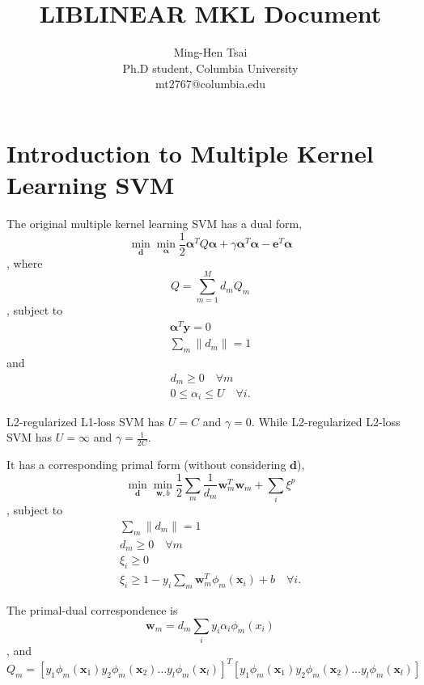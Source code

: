 \documentclass[12pt]{article}
\def\bw{{\boldsymbol w}}
\def\balpha{{\boldsymbol \alpha}}
\def\bd{{\boldsymbol d}}
\def\be{{\boldsymbol e}}
\def\bx{{\boldsymbol x}}
\def\by{{\boldsymbol y}}
\begin{document}
\title{LIBLINEAR MKL Document}
\author{Ming-Hen Tsai 
  \\ Ph.D student, Columbia University
  \\ mt2767@columbia.edu}
\maketitle
\section{Introduction to Multiple Kernel Learning SVM}
The original multiple kernel learning SVM has a dual form,
\begin{equation}
\label{eq:mkl_svm_dual}
\min_{\bd} \min_{\balpha} \frac{1}{2} \balpha^T Q \balpha + \gamma \balpha^T \balpha - \be^T \balpha 
\end{equation}
, where 
\begin{equation}
\label{eq:mkl_svm_dual_sum_kernel}
Q = \sum_{m=1}^M d_m Q_m 
\end{equation}
, subject to
\begin{align}
\label{eq:mkl_svm_dual_eq_constraint}
\balpha^T \by = 0 \\
\sum_m \|d_m\| = 1
\end{align}
and
\begin{align}
\label{eq:mkl_svm_dual_ineq_constraint}
d_m \ge 0 \quad \forall m\\
0 \le \alpha_i \le U \quad \forall i \mbox{.}
\end{align}

L2-regularized L1-loss SVM has $U = C$ and $\gamma = 0$. While
L2-regularized L2-loss SVM has $U = \infty$ and $\gamma = \frac{1}{2C}$.

It has a corresponding primal form (without considering $\bd$),
\begin{equation}
\label{eq:mkl_svm_primal}
\min_{\bd} \min_{\bw,b} \frac{1}{2} \sum_m \frac{1}{d_m} \bw_m^T \bw_m + \sum_i \xi^p
\end{equation}
, subject to
\begin{align}
\label{eq:mkl_svm_primal_ineq_constraint}
\sum_m \|d_m\| = 1\\
d_m \ge 0 \quad \forall m\\
\xi_i \ge 0 \\
\xi_i \ge 1-y_i \sum_m \bw_m^T \phi_m(\bx_i) + b \quad \forall i \mbox{.}
\end{align}

The primal-dual correspondence is
\begin{equation}
\label{eq:primal_dual_correspondence_w}
\bw_m = d_m \sum_i y_i \alpha_i \phi_m(x_i) 
\end{equation}
, and
\begin{equation}
\label{eq:primal_dual_correspondence_Q}
Q_m = 
[y_1\phi_m(\bx_1)  y_2\phi_m(\bx_2) \ldots y_l\phi_m(\bx_l)]^T 
[y_1\phi_m(\bx_1)  y_2\phi_m(\bx_2) \ldots y_l\phi_m(\bx_l)]
\end{equation}
\end{document}
